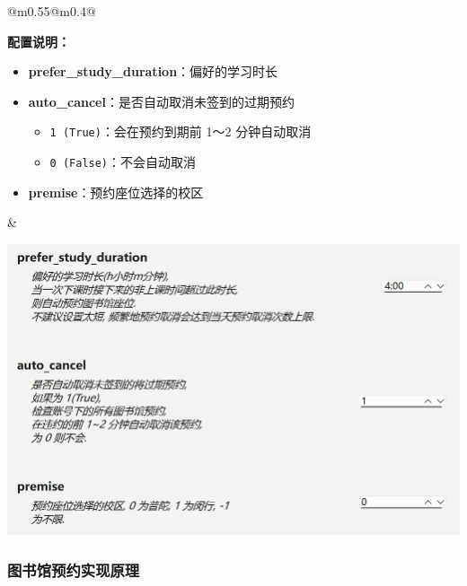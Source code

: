 \documentclass[14pt,a4paper,UTF8,twoside]{article}
\begin{document}
\begin{table}[H]
    \centering
    \begin{tabular}{@{}m{0.55\textwidth}@{}m{0.4\textwidth}@{}}
        \begin{minipage}[H]{\linewidth}
            \textbf{配置说明：}
            \begin{itemize}[label=--]
                \item \textbf{prefer\_study\_duration}：偏好的学习时长
                \item \textbf{auto\_cancel}：是否自动取消未签到的过期预约
                \begin{itemize}
                    \item \texttt{1 (True)}：会在预约到期前 1～2 分钟自动取消
                    \item \texttt{0 (False)}：不会自动取消
                \end{itemize}
                \item \textbf{premise}：预约座位选择的校区
            \end{itemize}
        \end{minipage}
        &
        \begin{minipage}[H]{\linewidth}
            \centering
            \includegraphics[width=\linewidth]{img/library_plugin_config.png}
            \caption{图书馆预约配置}
            \label{fig:library_config}
        \end{minipage}
    \end{tabular}
\end{table}

\subsubsection{图书馆预约实现原理}
\end{document}
